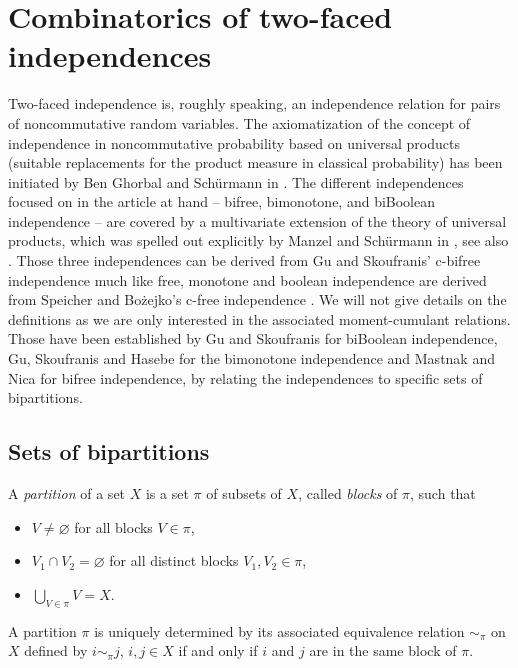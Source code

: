 \documentclass[pdftex]{sigma}
\numberwithin{equation}{section}
\begin{document}
\section{Combinatorics of two-faced independences}\label{sec:bckgnd}

Two-faced independence is, roughly speaking, an independence relation for pairs
of noncommutative random variables. The axiomatization of the concept of
independence in noncommutative probability based on universal products
(suitable replacements for the product measure in classical probability) has
been initiated by Ben Ghorbal and Sch\"urmann in \cite{BenGhorbalSchurmann}. The
different independences focused on in the article at hand -- bifree,
bimonotone, and biBoolean independence -- are covered by a multivariate
extension of the theory of universal products, which was spelled out explicitly
by Manzel and Sch\"urmann in \cite{ManzelSchurmann17}, see also \cite[Section
3]{Gerhold21p}. Those three independences can be derived from Gu and
Skoufranis' c-bifree independence \cite{gu2017bi} much like free, monotone
and boolean independence are derived from Speicher and Bo\.zejko's c-free
independence \cite{BozejkoSpeicher1991}. We will not give details on the
definitions as we are only interested in the associated moment-cumulant
relations. Those have been established by Gu and Skoufranis  \cite{gu2019bi} for biBoolean
independence, Gu, Skoufranis and Hasebe  \cite{gu2020bi} for the bimonotone independence and Mastnak and Nica
\cite{mastnak2015double} for bifree independence, by relating the independences
to specific sets of bipartitions.

\subsection{Sets of bipartitions}
\label{sec:setsofbipartition}

A {\it partition} of a set $X$ is a set $\pi$ of subsets of $X$, called {\it blocks} of $\pi$, such that
\begin{itemize}\itemsep=0pt
	\item $V\neq\varnothing$ for all blocks $V\in \pi$,
	\item $V_1\cap V_2=\varnothing$ for all distinct blocks $V_1,V_2\in \pi$,
	\item $\displaystyle \bigcup_{V\in \pi} V=X$.
\end{itemize}

A partition $\pi$ is uniquely determined by its associated equivalence relation $\sim_\pi$ on $X$ defined by
$i \sim_\pi j$, $i,j\in X$ if and only if $i$ and $j$ are in the same block of $\pi$.
\end{document}
